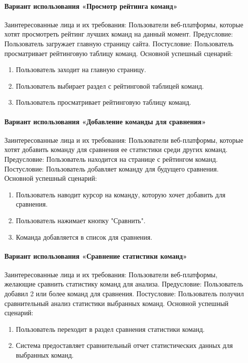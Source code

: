 \paragraph{Вариант использования «Просмотр рейтинга команд»}
Заинтересованные лица и их требования: Пользователи веб-платформы, которые хотят просмотреть рейтинг лучших команд на данный момент.
Предусловие: Пользователь загружает главную страницу сайта.
Постусловие: Пользователь просматривает рейтинговую таблицу команд.
Основной успешный сценарий:
\begin{enumerate}
	\item Пользователь заходит на главную страницу.
	\item Пользователь выбирает раздел с рейтинговой таблицей команд.
	\item Пользователь просматривает рейтинговую таблицу команд.
\end{enumerate}

\paragraph{Вариант использования «Добавление команды для сравнения»}
Заинтересованные лица и их требования: Пользователи веб-платформы, которые хотят добавить команду для сравнения ее статистики среди других команд.
Предусловие: Пользователь находится на странице с рейтингом команд.
Постусловие: Пользователь добавляет команду для будущего сравнения.
Основной успешный сценарий:
\begin{enumerate}
	\item Пользователь наводит курсор на команду, которую хочет добавить для сравнения.
	\item Пользователь нажимает кнопку "Сравнить".
	\item Команда добавляется в список для сравнения.
\end{enumerate}

\paragraph{Вариант использования «Сравнение статистики команд»}
Заинтересованные лица и их требования: Пользователи веб-платформы, желающие сравнить статистику команд для анализа.
Предусловие: Пользователь добавил 2 или более команд для сравнения.
Постусловие: Пользователь получил сравнительный анализ статистики выбранных команд.
Основной успешный сценарий:
\begin{enumerate}
	\item Пользователь переходит в раздел сравнения статистики команд.
	\item Система предоставляет сравнительный отчет статистических данных для выбранных команд.
\end{enumerate}

